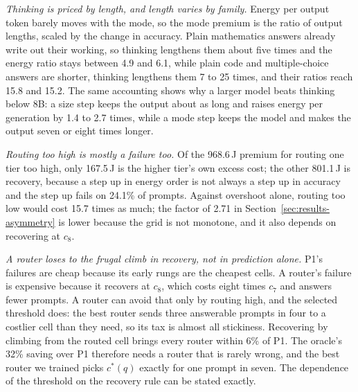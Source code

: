\documentclass[final,5p,times,twocolumn]{elsarticle}
\theoremstyle{plain}
\newcommand{\cstar}{c^{*}}
\begin{document}
\emph{Thinking is priced by length, and length varies by family.} Energy per
output token barely moves with the mode, so the mode premium is the ratio of
output lengths, scaled by the change in accuracy. Plain mathematics answers
already write out their working, so thinking lengthens them about five times
and the energy ratio stays between 4.9 and 6.1, while plain code and
multiple-choice answers are shorter, thinking lengthens them 7 to 25 times,
and their ratios reach 15.8 and 15.2. The same accounting shows why a larger
model beats thinking below 8B: a size step keeps the output about as long and
raises energy per generation by 1.4 to 2.7 times, while a mode step keeps the
model and makes the output seven or eight times longer.

\emph{Routing too high is mostly a failure too.} Of the 968.6\,J premium for
routing one tier too high, only 167.5\,J is the higher tier's own excess
cost; the other 801.1\,J is recovery, because a step up in energy order is
not always a step up in accuracy and the step up fails on 24.1\% of prompts.
Against overshoot alone, routing too low would cost 15.7 times as much; the
factor of 2.71 in Section~\ref{sec:results-asymmetry} is lower because the
grid is not monotone, and it also depends on recovering at $c_8$.

\emph{A router loses to the frugal climb in recovery, not in prediction
alone.} P1's failures are cheap because its early rungs are the cheapest
cells. A router's failure is expensive because it recovers at $c_8$, which
costs eight times $c_7$ and answers fewer prompts. A router can avoid that
only by routing high, and the selected threshold does: the best router sends
three answerable prompts in four to a costlier cell than they need, so its
tax is almost all stickiness. Recovering by climbing from the routed cell
brings every router within 6\% of P1. The oracle's 32\% saving over P1
therefore needs a router that is rarely wrong, and the best router we trained
picks $\cstar(q)$ exactly for one prompt in seven. The dependence of the
threshold on the recovery rule can be stated exactly.
\end{document}
